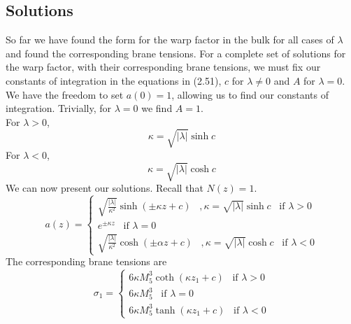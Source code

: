 \documentclass[11pt]{report}
\numberwithin{equation}{chapter}
\begin{document}
\subsection{Solutions}
So far we have found the form for the warp factor in the bulk for all cases of $\lambda$ and found the corresponding brane tensions. For a complete set of solutions for the warp factor, with their corresponding brane tensions, we must fix our constants of integration in the equations in (2.51), $c$ for $\lambda \neq 0$ and $A$ for $\lambda = 0$. We have the freedom to set $a(0) = 1$, allowing us to find our constants of integration. Trivially, for $\lambda = 0$ we find $A=1$.\\ For $\lambda>0$,
\begin{equation}
    \kappa = \sqrt{|\lambda|}\sinh{c}
\end{equation}
For $\lambda < 0$,
\begin{equation}
    \kappa = \sqrt{|\lambda|}\cosh{c}
\end{equation}
We can now present our solutions. Recall that $N(z)=1$.
\begin{equation}
    a\left(z\right)=
    \begin{cases}
        \sqrt{\frac{|\lambda |}{\kappa^2}}\sinh\left(\pm\kappa z+c\right)\hspace{10pt}, \kappa=\sqrt{|\lambda|}\sinh{c}\hspace{10pt}\text{if } \lambda > 0\\[10pt]
        e^{\pm\kappa z}\hspace{10pt}\text{if } \lambda = 0\\[10pt]
        \sqrt{\frac{|\lambda |}{\kappa^2}}\cosh\left(\pm\alpha z+c\right) \hspace{10pt}, \kappa=\sqrt{|\lambda|}\cosh{c}\hspace{10pt}\text{if } \lambda < 0
    \end{cases}
\end{equation}
The corresponding brane tensions are
\begin{equation}
    \sigma_1=
    \begin{cases}
         6\kappa M^3_5\coth{\left(\kappa z_1 + c\right)}\hspace{10pt}\text{if } \lambda > 0\\[10pt]
        6\kappa M^3_5\hspace{10pt}\text{if } \lambda = 0\\[10pt]
        6\kappa M^3_5\tanh{\left(\kappa z_1 +c\right)}\hspace{10pt}\text{if } \lambda < 0
    \end{cases}
\end{equation}
\end{document}
